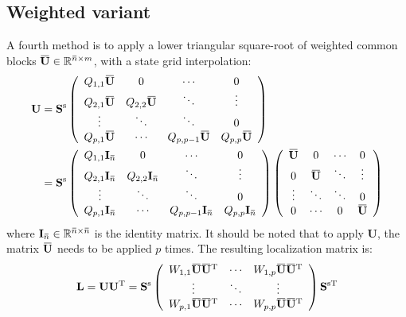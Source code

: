 \documentclass[12pt]{scrartcl}
\newcommand{\overbar}[1]{\mkern 1.5mu\overline{\mkern-1.5mu#1\mkern-1.5mu}\mkern 1.5mu}
\begin{document}
\subsection{Weighted variant}
A fourth method is to apply a lower triangular square-root of weighted common blocks $\overbar{\mathbf{U}} \in \mathbb{R}^{\overbar{n} \times m}$, with a state grid interpolation:
\begin{align}
\mathbf{U} & = \mathbf{S}^\mathrm{s} \left( \begin{array}{cccc}
Q_{1,1} \overbar{\mathbf{U}} & 0 & \cdots & 0 \\
Q_{2,1} \overbar{\mathbf{U}} & Q_{2,2} \overbar{\mathbf{U}} & \ddots & \vdots \\
\vdots & \ddots & \ddots & 0 \\
Q_{p,1} \overbar{\mathbf{U}} & \cdots & Q_{p,p-1} \overbar{\mathbf{U}} & Q_{p,p} \overbar{\mathbf{U}}
\end{array} \right) \\
 & = \mathbf{S}^\mathrm{s} \left( \begin{array}{cccc}
Q_{1,1} \mathbf{I}_{\overbar{n}} & 0 & \cdots & 0 \\
Q_{2,1} \mathbf{I}_{\overbar{n}} & Q_{2,2} \mathbf{I}_{\overbar{n}} & \ddots & \vdots \\
\vdots & \ddots & \ddots & 0 \\
Q_{p,1} \mathbf{I}_{\overbar{n}} & \cdots & Q_{p,p-1} \mathbf{I}_{\overbar{n}} & Q_{p,p} \mathbf{I}_{\overbar{n}}
\end{array} \right) \left( \begin{array}{cccc}
\overbar{\mathbf{U}} & 0 & \cdots & 0 \\
0 & \overbar{\mathbf{U}} & \ddots & \vdots \\
\vdots & \ddots & \ddots & 0 \\
0 & \cdots & 0 & \overbar{\mathbf{U}} 
\end{array} \right)
\end{align}
where $\mathbf{I}_{\overbar{n}} \in \mathbb{R}^{\overbar{n} \times \overbar{n}}$ is the identity matrix. It should be noted that to apply $\mathbf{U}$, the matrix $\overbar{\mathbf{U}}$ needs to be applied $p$ times. The resulting localization matrix is:
\begin{align}
\mathbf{L} = \mathbf{U} \mathbf{U}^\mathrm{T} = \mathbf{S}^\mathrm{s} \left( \begin{array}{ccc}
W_{1,1} \overbar{\mathbf{U}} \overbar{\mathbf{U}}^\mathrm{T} & \cdots & W_{1,p} \overbar{\mathbf{U}} \overbar{\mathbf{U}}^\mathrm{T} \\
\vdots & \ddots & \vdots  \\
W_{p,1} \overbar{\mathbf{U}} \overbar{\mathbf{U}}^\mathrm{T} & \cdots & W_{p,p} \overbar{\mathbf{U}} \overbar{\mathbf{U}}^\mathrm{T}
\end{array} \right) \mathbf{S}^{\mathrm{s} \mathrm{T}}
\end{align}
\end{document}
